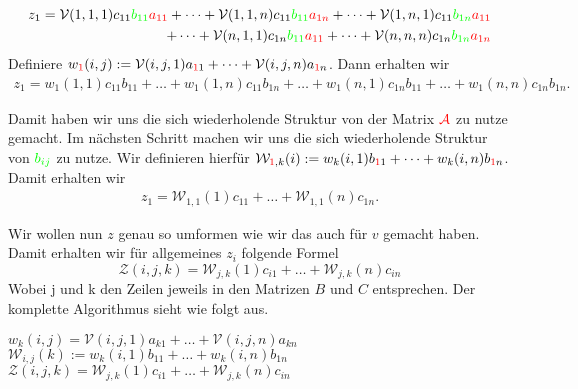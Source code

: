 \begin{equation} \label{eq:zold}
\begin{aligned}
z_{1} = \mathcal{V}(1,1,1) c_{11} \textcolor{green}{b_{11}} \textcolor{red}{a_{11}}+ \dots +  \mathcal{V}(1,1,n) c_{11} \textcolor{green}{b_{11}} \textcolor{red}{a_{1n}} + \dots  +  \mathcal{V}(1,n,1)c_{11} 
\textcolor{green}{b_{1n}} \textcolor{red}{a_{11}} \\ + \dots +  \mathcal{V}(n,1,1) c_{1n} \textcolor{green}{b_{11}} \textcolor{red}{a_{11}} + \dots +  \mathcal{V}(n,n,n) c_{1n} \textcolor{green}{b_{1n}} \textcolor{red}{a_{1n}}
\end{aligned}
\end{equation}
Definiere $w_{\textcolor{red}{1}}(i,j) :=\mathcal{V}(i,j,1) a_{\textcolor{red}{1}1}+\dots+\mathcal{V}(i,j,n) a_{\textcolor{red}{1}n}$. Dann erhalten wir
\begin{equation*}
\begin{aligned}
z_{1}= w_1(1,1) c_{11} b_{11} + \dots +   w_1(1,n) c_{11} b_{1n} + \dots + w_1(n,1) c_{1n} b_{11}  + \dots +  w_1(n,n) c_{1n} b_{1n}.
\end{aligned}
\end{equation*}

Damit haben wir uns die sich wiederholende Struktur von der Matrix $\textcolor{red}{\mathcal{A}}$ zu nutze gemacht. Im nächsten Schritt machen wir uns die sich wiederholende Struktur von $\textcolor{green}{b_{ij}}$ zu nutze.
Wir definieren hierfür $\mathcal{W}_{\textcolor{red}{1},k} (i):= w_k(i,1) b_{\textcolor{red}{1}1} + \dots + w_k(i,n) b_{\textcolor{red}{1}n}$. Damit erhalten wir
\begin{equation} \label{eq:znew}
\begin{aligned}
z_{1}= \mathcal{W}_{1,1}(1) c_{11}  + \dots +  \mathcal{W}_{1,1}(n) c_{1n}.
\end{aligned}
\end{equation}

Wir wollen nun $z$ genau so umformen wie wir das auch für $v$ gemacht haben. Damit erhalten wir für allgemeines $z_{i}$ folgende Formel
\begin{equation}
\mathcal{Z}(i,j,k) = \mathcal{W}_{j,k}(1) c_{i1}  + \dots +  \mathcal{W}_{j,k}(n) c_{in} 
\end{equation}
Wobei j und k den Zeilen jeweils in den Matrizen $B$ und $C$ entsprechen. 
\newpage
Der komplette Algorithmus sieht wie folgt aus.
\begin{mdframed}[backgroundcolor=blue!3] 
\begin{algorithmic}
			\State $w_{k}(i,j) = \mathcal{V}(i,j,1)a_{k1} + \dots + \mathcal{V}(i,j,n)a_{kn}$
		\EndFor
	\EndFor
\EndFor
{}
			\State $\mathcal{W}_{i,j} (k):= w_k(i,1) b_{11} + \dots + w_k(i,n) b_{1n}$
		\EndFor
	\EndFor
\EndFor
{}
			\State $\mathcal{Z}(i,j,k) = \mathcal{W}_{j,k}(1) c_{i1}  + \dots +  \mathcal{W}_{j,k}(n) c_{in}$ 
		\EndFor
	\EndFor
\EndFor
\end{algorithmic}
\end{mdframed}


